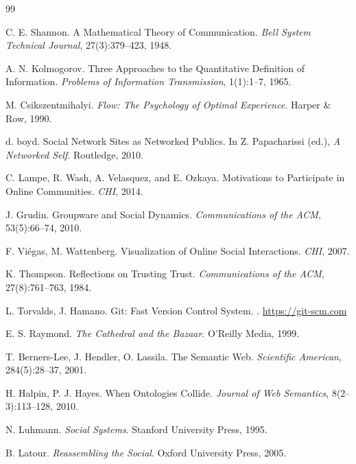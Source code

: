 \documentclass[11pt]{article}
\begin{document}
\begin{thebibliography}{99}

C. E. Shannon.
\newblock A Mathematical Theory of Communication.
\newblock \emph{Bell System Technical Journal}, 27(3):379--423, 1948.

A. N. Kolmogorov.
\newblock Three Approaches to the Quantitative Definition of Information.
\newblock \emph{Problems of Information Transmission}, 1(1):1--7, 1965.

M. Csikszentmihalyi.
\newblock \emph{Flow: The Psychology of Optimal Experience}.
\newblock Harper \& Row, 1990.

d. boyd.
\newblock Social Network Sites as Networked Publics.
\newblock In Z. Papacharissi (ed.), \emph{A Networked Self}.
\newblock Routledge, 2010.

C. Lampe, R. Wash, A. Velasquez, and E. Ozkaya.
\newblock Motivations to Participate in Online Communities.
\newblock \emph{CHI}, 2014.

J. Grudin.
\newblock Groupware and Social Dynamics.
\newblock \emph{Communications of the ACM}, 53(5):66--74, 2010.

F. Vi{\'e}gas, M. Wattenberg.
\newblock Visualization of Online Social Interactions.
\newblock \emph{CHI}, 2007.

K. Thompson.
\newblock Reflections on Trusting Trust.
\newblock \emph{Communications of the ACM}, 27(8):761--763, 1984.

L. Torvalds, J. Hamano.
\newblock Git: Fast Version Control System.
. \url{https://git-scm.com}

E. S. Raymond.
\newblock \emph{The Cathedral and the Bazaar}.
\newblock O’Reilly Media, 1999.

T. Berners-Lee, J. Hendler, O. Lassila.
\newblock The Semantic Web.
\newblock \emph{Scientific American}, 284(5):28--37, 2001.

H. Halpin, P. J. Hayes.
\newblock When Ontologies Collide.
\newblock \emph{Journal of Web Semantics}, 8(2--3):113--128, 2010.

N. Luhmann.
\newblock \emph{Social Systems}.
\newblock Stanford University Press, 1995.

B. Latour.
\newblock \emph{Reassembling the Social}.
\newblock Oxford University Press, 2005.


\end{thebibliography}
\end{document}
